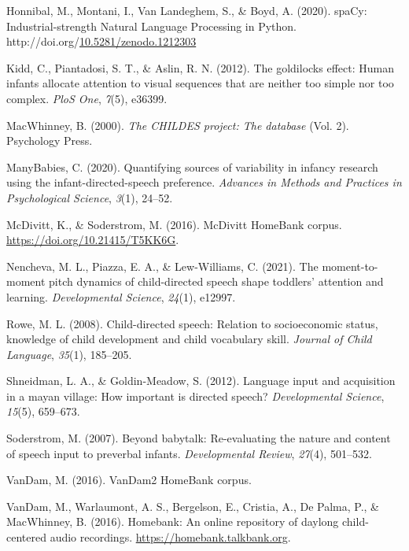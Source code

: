\documentclass[10pt, letterpaper]{article}
\newenvironment{CSLReferences}%
  {}%
  {\par}
\begin{document}
\begin{CSLReferences}{1}{0}
\leavevmode\hypertarget{ref-honnibal2020spacy}{}%
Honnibal, M., Montani, I., Van Landeghem, S., \& Boyd, A. (2020).
{spaCy: Industrial-strength Natural Language Processing in Python}.
http://doi.org/\href{https://doi.org/10.5281/zenodo.1212303}{10.5281/zenodo.1212303}

\leavevmode\hypertarget{ref-kidd2012goldilocks}{}%
Kidd, C., Piantadosi, S. T., \& Aslin, R. N. (2012). The goldilocks
effect: Human infants allocate attention to visual sequences that are
neither too simple nor too complex. \emph{PloS One}, \emph{7}(5),
e36399.

\leavevmode\hypertarget{ref-macwhinney2000childes}{}%
MacWhinney, B. (2000). \emph{The CHILDES project: The database} (Vol.
2). Psychology Press.

\leavevmode\hypertarget{ref-manybabies2020quantifying}{}%
ManyBabies, C. (2020). Quantifying sources of variability in infancy
research using the infant-directed-speech preference. \emph{Advances in
Methods and Practices in Psychological Science}, \emph{3}(1), 24--52.

\leavevmode\hypertarget{ref-soderstromcorpus}{}%
McDivitt, K., \& Soderstrom, M. (2016). McDivitt HomeBank corpus.
\url{https://doi.org/10.21415/T5KK6G}.

\leavevmode\hypertarget{ref-nencheva2021moment}{}%
Nencheva, M. L., Piazza, E. A., \& Lew-Williams, C. (2021). The
moment-to-moment pitch dynamics of child-directed speech shape toddlers'
attention and learning. \emph{Developmental Science}, \emph{24}(1),
e12997.

\leavevmode\hypertarget{ref-rowe2008child}{}%
Rowe, M. L. (2008). Child-directed speech: Relation to socioeconomic
status, knowledge of child development and child vocabulary skill.
\emph{Journal of Child Language}, \emph{35}(1), 185--205.

\leavevmode\hypertarget{ref-shneidman2012language}{}%
Shneidman, L. A., \& Goldin-Meadow, S. (2012). Language input and
acquisition in a mayan village: How important is directed speech?
\emph{Developmental Science}, \emph{15}(5), 659--673.

\leavevmode\hypertarget{ref-soderstrom2007beyond}{}%
Soderstrom, M. (2007). Beyond babytalk: Re-evaluating the nature and
content of speech input to preverbal infants. \emph{Developmental
Review}, \emph{27}(4), 501--532.

\leavevmode\hypertarget{ref-vandamcorpus}{}%
VanDam, M. (2016). VanDam2 HomeBank corpus.

\leavevmode\hypertarget{ref-homebank}{}%
VanDam, M., Warlaumont, A. S., Bergelson, E., Cristia, A., De Palma, P.,
\& MacWhinney, B. (2016). Homebank: An online repository of daylong
child-centered audio recordings. \url{https://homebank.talkbank.org}.


\end{CSLReferences}
\end{document}
